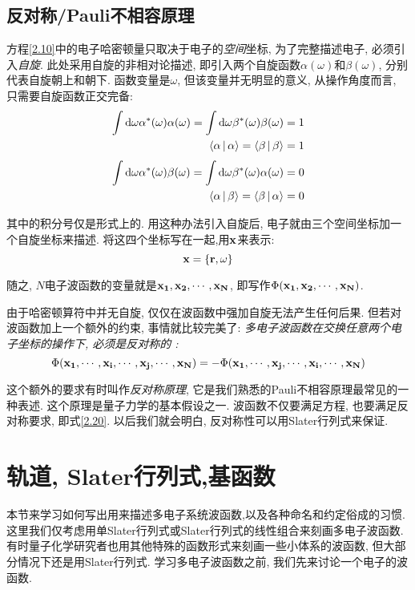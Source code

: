 \subsection{反对称/Pauli不相容原理}
\label{sec2.1.3}
方程\ref{2.10}中的电子哈密顿量只取决于电子的\emph{空间}坐标, 为了完整描述电子, 必须引入\emph{自旋}. 此处采用自旋的非相对论描述, 即引入两个自旋函数$\alpha(\omega)$和$\beta(\omega)$, 分别代表自旋朝上和朝下. 函数变量是$\omega$, 但该变量并无明显的意义, 从操作角度而言, 只需要自旋函数正交完备:
\begin{subequations}
	\begin{align}
\int\dd\omega\alpha^*(\omega)\alpha(\omega)=\int\dd\omega\beta^*(\omega)\beta(\omega)=1\\
\braket{\alpha|\alpha}=\braket{\beta|\beta}=1
	\end{align}
\end{subequations}
\begin{subequations}
	\begin{align}
	\int\dd\omega\alpha^*(\omega)\beta(\omega)=\int\dd\omega\beta^*(\omega)\alpha(\omega)=0\\
	\braket{\alpha|\beta}=\braket{\beta|\alpha}=0
	\end{align}
\end{subequations}

其中的积分号仅是形式上的. 用这种办法引入自旋后, 电子就由三个空间坐标加一个自旋坐标来描述. 将这四个坐标写在一起,用$\mathbf{x}$来表示:
 \begin{equation}
 \label{2.21}
 \mathbf{x}=\{\mathbf{r},\omega\}
 \end{equation}

 随之, $N$电子波函数的变量就是$ \mathbf{x_1,x_2,\cdots ,x_N} $, 即写作$\Phi(\mathbf{x_1,x_2,\cdots ,x_N})$.
 
 由于哈密顿算符中并无自旋, 仅仅在波函数中强加自旋无法产生任何后果. 但若对波函数加上一个额外的约束, 事情就比较完美了: \emph{多电子波函数在交换任意两个电子坐标的操作下, 必须是反对称的
 :}
\begin{equation}
\label{2.22}
\Phi(\mathbf{x_1,\cdots,x_i,\cdots,x_j,\cdots ,x_N})=-\Phi(\mathbf{x_1,\cdots,x_j,\cdots,x_i,\cdots ,x_N})
\end{equation}

 这个额外的要求有时叫作\emph{反对称原理}, 它是我们熟悉的Pauli不相容原理最常见的一种表述. 这个原理是量子力学的基本假设之一. 波函数不仅要满足\sch 方程, 也要满足反对称要求, 即式\ref{2.20}. 以后我们就会明白, 反对称性可以用Slater行列式来保证.
 
\section{轨道, Slater行列式,基函数}
\label{sec2.2}
 本节来学习如何写出用来描述多电子系统波函数,以及各种命名和约定俗成的习惯. 这里我们仅考虑用单Slater行列式或Slater行列式的线性组合来刻画多电子波函数. 有时量子化学研究者也用其他特殊的函数形式来刻画一些小体系的波函数, 但大部分情况下还是用Slater行列式. 学习多电子波函数之前, 我们先来讨论一个电子的波函数.
 
